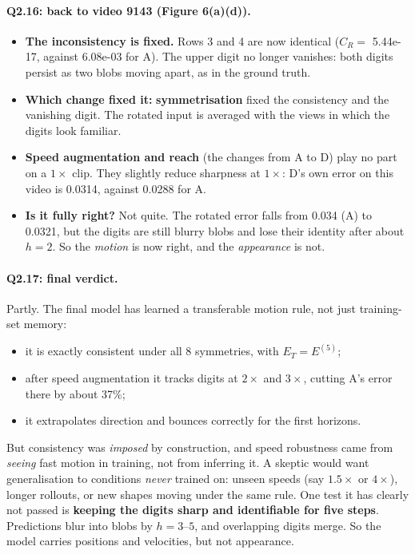 \documentclass[11pt,a4paper]{article}
\begin{document}
\paragraph{Q2.16: back to video 9143 (Figure 6(a)(d)).}
\begin{itemize}
  \item \textbf{The inconsistency is fixed.} Rows 3 and 4 are now identical
        ($C_R=$ 5.44e-17, against 6.08e-03 for A). The upper digit no longer
        vanishes: both digits persist as two blobs moving apart, as in the
        ground truth.
  \item \textbf{Which change fixed it:} \textbf{symmetrisation} fixed the
        consistency and the vanishing digit. The rotated input is averaged with
        the views in which the digits look familiar.
  \item \textbf{Speed augmentation and reach} (the changes from A to D) play no
        part on a $1\times$ clip. They slightly reduce sharpness at $1\times$:
        D's own error on this video is 0.0314, against 0.0288 for A.
  \item \textbf{Is it fully right?} Not quite. The rotated error falls from
        0.034 (A) to 0.0321, but the digits are still blurry blobs and lose
        their identity after about $h=2$. So the \emph{motion} is now right,
        and the \emph{appearance} is not.
\end{itemize}

\paragraph{Q2.17: final verdict.} Partly. The final model has learned a
transferable motion rule, not just training-set memory:
\begin{itemize}
  \item it is exactly consistent under all 8 symmetries, with $E_T=E^{(5)}$;
  \item after speed augmentation it tracks digits at $2\times$ and $3\times$,
        cutting A's error there by about 37\%;
  \item it extrapolates direction and bounces correctly for the first horizons.
\end{itemize}
But consistency was \emph{imposed} by construction, and speed robustness came
from \emph{seeing} fast motion in training, not from inferring it. A skeptic
would want generalisation to conditions \emph{never} trained on: unseen speeds
(say $1.5\times$ or $4\times$), longer rollouts, or new shapes moving under the
same rule. One test it has clearly not passed is \textbf{keeping the digits
sharp and identifiable for five steps}. Predictions blur into blobs by
$h=3$--$5$, and overlapping digits merge. So the model carries positions and
velocities, but not appearance.
\end{document}
